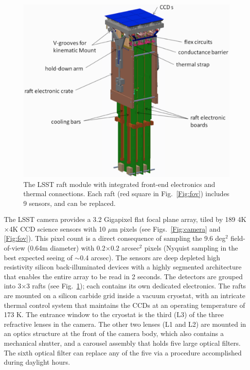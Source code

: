 \documentclass{emulateapj}
\begin{document}
\begin{figure}[ht]
\includegraphics[width=1.\hsize,clip]{raft-updated-cropped.pdf}
\caption{The LSST raft module with integrated front-end electronics
and thermal connections. Each raft (red square in Fig.~\ref{Fig:fov})
includes 9 sensors, and can be replaced.} 
\label{Fig:raft}
\end{figure}


The LSST camera provides a 3.2 Gigapixel flat focal plane array, tiled by 189
4K$\times$4K CCD science sensors with 10 $\mu$m pixels (see Figs.~\ref{Fig:camera}
and \ref{Fig:fov}). This pixel count is a direct consequence of sampling the 
9.6 deg$^2$ field-of-view (0.64m diameter) with 0.2$\times$0.2 arcsec$^2$
pixels (Nyquist sampling in the best expected seeing of $\sim$0.4 arcsec). 
The sensors are deep depleted high resistivity silicon back-illuminated devices with 
a highly segmented architecture that enables the entire array to be read in 2 seconds. 
The detectors are grouped into 3$\times$3 rafts (see Fig.~\ref{Fig:raft}); each 
contains its own dedicated electronics. The rafts are mounted on a silicon carbide 
grid inside a vacuum cryostat, with an intricate thermal control system that maintains 
the CCDs at an operating temperature of 173 K. The entrance window to the
cryostat is the third (L3) of the three refractive lenses in the camera. The other
two lenses (L1 and L2) are mounted in an optics structure at the front of the camera 
body, which also contains a mechanical shutter, and a carousel assembly that holds 
five large optical filters. The sixth optical filter can 
replace any of the five via a procedure accomplished during daylight hours. 
\end{document}
